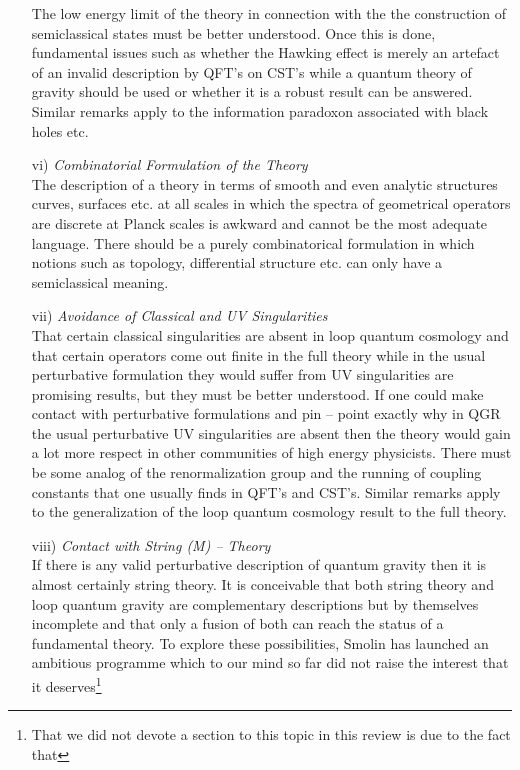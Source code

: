 \documentclass[12pt]{report}
\begin{document}
\begin{itemize}
The low energy limit of the theory in connection with the the construction 
of semiclassical states must be better understood. Once this is done, 
fundamental issues such as whether the Hawking effect is merely an 
artefact of an invalid description by QFT's on CST's while a quantum 
theory of gravity should be used or whether it is a robust result can be 
answered. 
Similar remarks apply to the information paradoxon associated with
black holes etc.
%
\item[vi)] {\it Combinatorial Formulation of the Theory}\\
The description of a theory in terms of smooth and even analytic 
structures curves, surfaces etc. at all scales in which the spectra of 
geometrical operators are discrete at Planck scales is awkward and 
cannot be the most adequate language. There should be a purely
combinatorical formulation in which notions such as topology, differential 
structure etc. can only have a semiclassical meaning.
%
\item[vii)] {\it Avoidance of Classical and UV Singularities}\\
That certain classical singularities are absent in loop quantum 
cosmology and that certain operators come out finite in the full theory
while in the usual perturbative formulation they would suffer from 
UV singularities are promising results, but they must be better 
understood. If one could make contact with perturbative formulations 
and pin -- point exactly why in QGR the usual perturbative UV singularities 
are absent
then the theory would gain a lot more respect in other communities of 
high energy physicists. There must be some analog of the renormalization 
group and the running of coupling constants that one usually finds
in QFT's and CST's.  Similar remarks apply to the generalization of the 
loop quantum cosmology result to the full theory.
%
\item[viii)] {\it Contact with String (M) -- Theory}\\
If there is any valid perturbative description of quantum gravity 
then it is almost certainly string theory. It is conceivable that
both string theory and loop quantum gravity are complementary descriptions 
but by themselves incomplete and that only a fusion of both can reach
the status of a fundamental theory. To explore these possibilities,
Smolin has launched an ambitious programme \cite{71} which to our mind 
so far did not raise the interest that it deserves\footnote{That we did 
not devote a section to this topic in this review is due to the fact that
}
\end{itemize}
\end{document}
